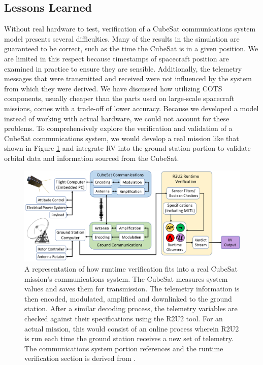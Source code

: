 \documentclass[conf]{new-aiaa}
\begin{document}
\subsection{Lessons Learned}

Without real hardware to test, verification of a CubeSat communications system model presents several difficulties. Many of the results in the simulation are guaranteed to be correct, such as the time the CubeSat is in a given position. We are limited in this respect because timestamps of spacecraft position are examined in practice to ensure they are sensible. Additionally, the telemetry messages that were transmitted and received were not influenced by the system from which they were derived. We have discussed how utilizing COTS components, usually cheaper than the parts used on large-scale spacecraft missions, comes with a trade-off of lower accuracy. Because we developed a model instead of working with actual hardware, we could not account for these problems. To comprehensively explore the verification and validation of a CubeSat communications system, we would develop a real mission like that shown in Figure \ref{CubeSatRVDiagram} and integrate RV into the ground station portion to validate orbital data and information sourced from the CubeSat. 

\begin{figure}[!ht]
\centering
\includegraphics[width=1\textwidth]{Fig/InFlight_Overview.png}
\caption{A representation of how runtime verification fits into a real CubeSat mission's communications system. The CubeSat measures system values and saves them for transmission. The telemetry information is then encoded, modulated, amplified and downlinked to the ground station. After a similar decoding process, the telemetry variables are checked against their specifications using the R2U2 tool. For an actual mission, this would consist of an online process wherein R2U2 is run each time the ground station receives a new set of telemetry. The communications system portion references \cite{Asundi2013} and the runtime verification section is derived from \cite{ARS17}.}
\label{CubeSatRVDiagram}
\end{figure}
\end{document}
